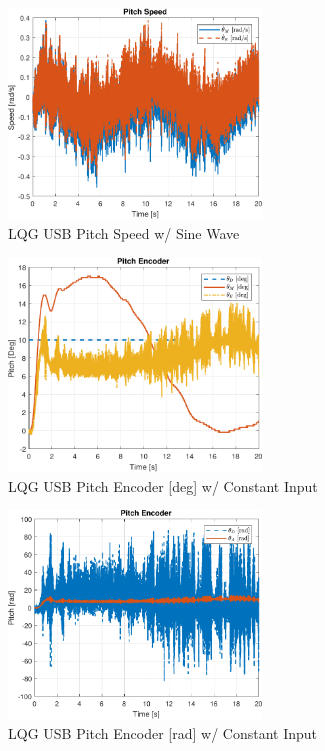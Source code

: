 \documentclass[fontsize=11pt, %
                             paper=letter, %
                             openany, %
                             captions=tableheading,
                             index=totoc,
                             hyperref]{labbook}
\begin{document}
\begin{addmargin}[0cm]{0cm}
\begin{figure}[h]
  \centering
  \includegraphics[width=0.6\textwidth]{figs/matlab/LQG_USB/Pitch_Speed_LQG_USB_SIN}
  \caption{LQG USB Pitch Speed w/ Sine Wave}
  \label{fig:Pitch_Speed_LQG_USB_SIN}
\end{figure}

\begin{figure}[h]
  \centering
  \includegraphics[width=0.6\textwidth]{figs/matlab/LQG_USB/Pitch_Pos_deg_LQG_USB_CON}
  \caption{LQG USB Pitch Encoder [deg] w/ Constant Input}
  \label{fig:Pitch_Pos_deg_LQG_USB_CON}
\end{figure}

\begin{figure}[h]
  \centering
  \includegraphics[width=0.6\textwidth]{figs/matlab/LQG_USB/Pitch_Pos_Rad_LQG_USB_CON}
  \caption{LQG USB Pitch Encoder [rad] w/ Constant Input}
  \label{fig:Pitch_Pos_Rad_LQG_USB_CON}
\end{figure}


\end{addmargin}
\end{document}
